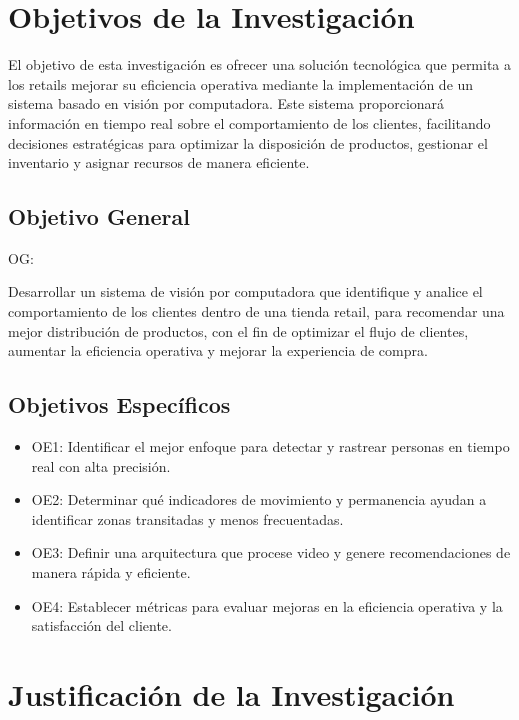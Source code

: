 \section{Objetivos de la Investigación}
El objetivo de esta investigación es ofrecer una solución tecnológica que permita a los retails mejorar su eficiencia operativa mediante la implementación de un sistema basado en visión por computadora. Este sistema proporcionará información en tiempo real sobre el comportamiento de los clientes, facilitando decisiones estratégicas para optimizar la disposición de productos, gestionar el inventario y asignar recursos de manera eficiente.
\subsection{Objetivo General}
OG:\newcommand{\ObjetivoGeneral}{
Desarrollar un sistema de visión por computadora que identifique y analice el comportamiento de los clientes dentro de una tienda retail, para recomendar una mejor distribución de productos, con el fin de optimizar el flujo de clientes, aumentar la eficiencia operativa y mejorar la experiencia de compra.
}
\ObjetivoGeneral
\subsection{Objetivos Espec\'{i}ficos}
\newcommand{\Objone}{
Identificar el mejor enfoque para detectar y rastrear personas en tiempo real con alta precisión.
}
\newcommand{\Objtwo}{
Determinar qué indicadores de movimiento y permanencia ayudan a identificar zonas transitadas y menos frecuentadas.
}
\newcommand{\Objthree}{
Definir una arquitectura que procese video y genere recomendaciones de manera rápida y eficiente.
}
\newcommand{\Objfour}{
Establecer métricas para evaluar mejoras en la eficiencia operativa y la satisfacción del cliente.
}

\begin{itemize}
	\item OE1: {\Objone}
	\item OE2: {\Objtwo}
	\item OE3: {\Objthree}
	\item OE4: {\Objfour}
\end{itemize}

\section{Justificación de la Investigación}

